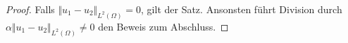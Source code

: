 \begin{proof}
  Falls $\Vert u_1 - u_2 \Vert_{L^2(\Omega)} = 0$, gilt der Satz.
  Ansonsten führt Division durch\\
  $\alpha\Vert u_1 - u_2 \Vert_{L^2(\Omega)}\neq 0$ den 
  Beweis zum Abschluss.
\end{proof}
